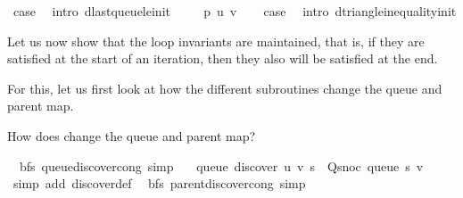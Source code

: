 \begin{isabellebody}
\ {\isacharquery}{\kern0pt}case\ \isamarkupfalse%
\ {\isacharparenleft}{\kern0pt}intro\ d{\isacharunderscore}{\kern0pt}last{\isacharunderscore}{\kern0pt}queue{\isacharunderscore}{\kern0pt}le{\isacharunderscore}{\kern0pt}init{\isacharparenright}{\kern0pt}\isanewline
{}\isamarkupfalse%
\isanewline
\ \ \isamarkupfalse%
\ {\isacharparenleft}{\kern0pt}{}{}\ p\ u\ v{\isacharparenright}{\kern0pt}\isanewline
\ \ \isamarkupfalse%
\ {\isacharquery}{\kern0pt}case\ \isamarkupfalse%
\ {\isacharparenleft}{\kern0pt}intro\ d{\isacharunderscore}{\kern0pt}triangle{\isacharunderscore}{\kern0pt}inequality{\isacharunderscore}{\kern0pt}init{\isacharparenright}{\kern0pt}\isanewline
{}\isamarkupfalse%
%
\endisatagproof
{\isafoldproof}%
%
\isadelimproof
%
\endisadelimproof
%
\begin{isamarkuptext}%
Let us now show that the loop invariants are maintained, that is, if they are satisfied at the start
of an iteration, then they also will be satisfied at the end.%
\end{isamarkuptext}\isamarkuptrue%
%
\begin{isamarkuptext}%
For this, let us first look at how the different subroutines change the queue and parent map.%
\end{isamarkuptext}\isamarkuptrue%
%
\begin{isamarkuptext}%
How does  change the queue and parent map?%
\end{isamarkuptext}\isamarkuptrue%
\isamarkupfalse%
\ {\isacharparenleft}{\kern0pt}\ bfs{\isacharparenright}{\kern0pt}\ queue{\isacharunderscore}{\kern0pt}discover{\isacharunderscore}{\kern0pt}cong\ {\isacharbrackleft}{\kern0pt}simp{\isacharbrackright}{\kern0pt}{\isacharcolon}{\kern0pt}\isanewline
\ \ \ {\isachardoublequoteopen}queue\ {\isacharparenleft}{\kern0pt}discover\ u\ v\ s{\isacharparenright}{\kern0pt}\ {\isacharequal}{\kern0pt}\ Q{\isacharunderscore}{\kern0pt}snoc\ {\isacharparenleft}{\kern0pt}queue\ s{\isacharparenright}{\kern0pt}\ v{\isachardoublequoteclose}\isanewline
%
\isadelimproof
\ \ %
\endisadelimproof
%
\isatagproof
{}\isamarkupfalse%
\ {\isacharparenleft}{\kern0pt}simp\ add{\isacharcolon}{\kern0pt}\ discover{\isacharunderscore}{\kern0pt}def{\isacharparenright}{\kern0pt}%
\endisatagproof
{\isafoldproof}%
%
\isadelimproof
\isanewline
%
\endisadelimproof
\isanewline
{}\isamarkupfalse%
\ {\isacharparenleft}{\kern0pt}\ bfs{\isacharparenright}{\kern0pt}\ parent{\isacharunderscore}{\kern0pt}discover{\isacharunderscore}{\kern0pt}cong\ {\isacharbrackleft}{\kern0pt}simp{\isacharbrackright}{\kern0pt}{\isacharcolon}{\kern0pt}\isanewline

\end{isabellebody}
